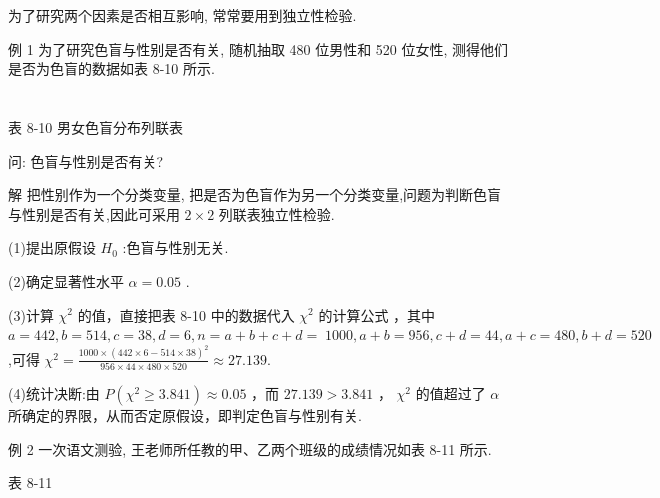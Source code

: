 \documentclass[10pt]{article}
\newcommand*\circled[1]{\tikz[baseline=(char.base)]{\node[shape=circle,draw,inner sep=1.5pt] (char) {\small #1};}}
\begin{document}
为了研究两个因素是否相互影响, 常常要用到独立性检验.

例 1 为了研究色盲与性别是否有关, 随机抽取 480 位男性和 520 位女性, 测得他们是否为色盲的数据如表 8-10 所示.



\section*{}

表 8-10 男女色盲分布列联表

\begin{center}
\end{center}

问: 色盲与性别是否有关?

解 把性别作为一个分类变量, 把是否为色盲作为另一个分类变量,问题为判断色盲与性别是否有关,因此可采用 \(2 \times  2\) 列联表独立性检验.

(1)提出原假设 \({H}_{0}\) :色盲与性别无关.

(2)确定显著性水平 \(\alpha  = {0.05}\) .

(3)计算 \({\chi }^{2}\) 的值，直接把表 8-10 中的数据代入 \({\chi }^{2}\) 的计算公式 \circled{1} ，其中 \(a = {442},b = {514},c = {38},d = 6,n = a + b + c + d = \; {1000},a + b = {956},c + d = {44},a + c = {480},b + d = {520}\) ,可得 \({\chi }^{2} = \frac{{1000} \times  {\left( {442} \times  6 - {514} \times  {38}\right) }^{2}}{{956} \times  {44} \times  {480} \times  {520}} \approx  {27.139}.\)

(4)统计决断:由 \(P\left( {{\chi }^{2} \geq  {3.841}}\right)  \approx  {0.05}\) ，而 \({27.139} > {3.841}\) ， \({\chi }^{2}\) 的值超过了 \(\alpha\) 所确定的界限，从而否定原假设，即判定色盲与性别有关.

例 2 一次语文测验, 王老师所任教的甲、乙两个班级的成绩情况如表 8-11 所示.

表 8-11

\begin{center}
\end{center}
\end{document}
